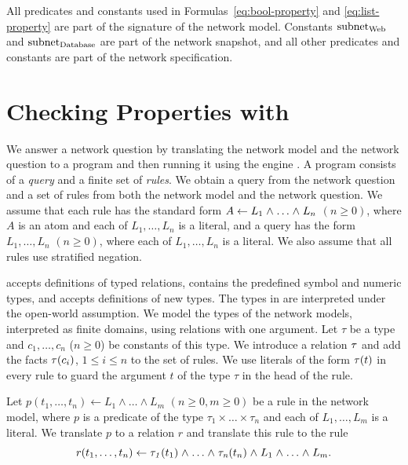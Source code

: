 All predicates and constants used in Formulas~\ref{eq:bool-property} and \ref{eq:list-property} are part of the signature of the network model. Constants $\mathrm{subnet}_\text{Web}$ and $\mathrm{subnet}_\text{Database}$ are part of the network snapshot, and all other predicates and constants are part of the network specification.

\section{Checking Properties with \Datalog}
\label{sect:aws/datalog}

We answer a network question by translating the network model and the network question to a \Datalog program and then running it using the \Datalog engine \souffle\cite{souffle}. A \Datalog program consists of a \Datalog \emph{query} and a finite set of \Datalog \textit{rules}. We obtain a query from the network question and a set of rules from both the network model and the network question. We assume that each \Datalog rule has the standard form $A\mathrel{\leftarrow} L_1\mathrel{\wedge}\ldots\mathrel{\wedge} L_n$ $(n\ge0)$, where $A$ is an atom and each of $L_1,\ldots,L_n$ is a literal, and a \Datalog query has the form $L_1\comma\ldots\comma L_n$ $(n\ge0)$, where each of $L_1,\ldots,L_n$ is a literal. We also assume that all \Datalog rules use stratified negation.


\souffle accepts definitions of typed relations, contains the predefined symbol and numeric types, and accepts definitions of new types. The types in \souffle are interpreted under the open-world assumption. We model the types of the network models, interpreted as finite domains, using \Datalog relations with one argument. Let $\tau$ be a type and $c_1,\ldots,c_n$ ($n\ge0$) be constants of this type. We introduce a relation $\mathit{\tau}$ and add the facts $\mathit{\tau}({c_i})$, $1\le i\le n$ to the set of \Datalog rules. We use literals of the form $\mathit{\tau}({t})$ in every \Datalog rule to guard the argument $t$ of the type $\tau$ in the head of the rule. 

Let $p(t_1,\ldots,t_n)\leftarrow L_1\wedge\ldots\wedge L_m$ $(n\ge0,m\ge0)$ be a rule in the network model, where $p$ is a predicate of the type $\tau_1\times\ldots\times\tau_n$ and each of $L_1,\ldots,L_m$ is a literal. We translate $p$ to a \Datalog relation $r$ and translate this rule to the \Datalog rule $$r(t_1,\ldots,t_n)\mathrel{\leftarrow}\mathit{\tau_1}({t_1})\mathrel{\wedge}\ldots\mathrel{\wedge}\mathit{\tau_n}({t_n})\mathrel{\wedge} L_1\mathrel{\wedge}\ldots\mathrel{\wedge} L_m.$$


